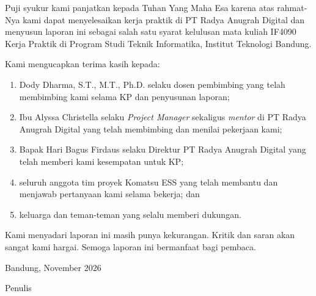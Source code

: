 \clearpage
{}

Puji syukur kami panjatkan kepada Tuhan Yang Maha Esa karena atas rahmat-Nya kami dapat menyelesaikan kerja praktik di PT Radya Anugrah Digital dan menyusun laporan ini sebagai salah satu syarat kelulusan mata kuliah IF4090 Kerja Praktik di Program Studi Teknik Informatika, Institut Teknologi Bandung.

Kami mengucapkan terima kasih kepada:
\begin{enumerate}[label=\arabic*)]
\item Dody Dharma, S.T., M.T., Ph.D. selaku dosen pembimbing yang telah membimbing kami selama KP dan penyusunan laporan;
\item Ibu Alyssa Christella selaku \textit{Project Manager} sekaligus \textit{mentor} di PT Radya Anugrah Digital yang telah membimbing dan menilai pekerjaan kami;
\item Bapak Hari Bagus Firdaus selaku Direktur PT Radya Anugrah Digital yang telah memberi kami kesempatan untuk KP;
\item seluruh anggota tim proyek Komatsu ESS yang telah membantu dan menjawab pertanyaan kami selama bekerja; dan
\item keluarga dan teman-teman yang selalu memberi dukungan.
\end{enumerate}

Kami menyadari laporan ini masih punya kekurangan. Kritik dan saran akan sangat kami hargai. Semoga laporan ini bermanfaat bagi pembaca.

\vspace{1.2cm}
\begin{flushright}
Bandung, November 2026

\vspace{1.2cm}
Penulis
\end{flushright}
